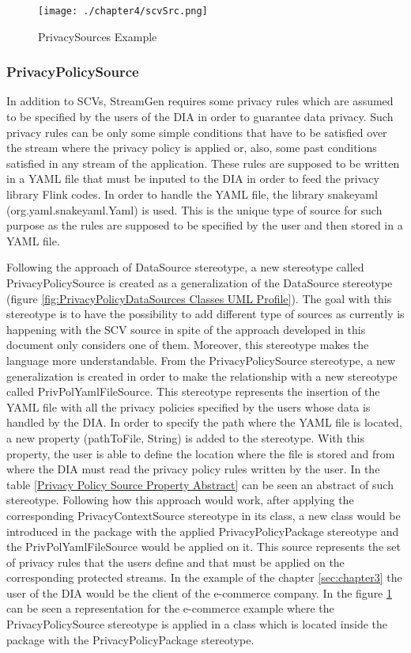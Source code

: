 \begin{figure}
\centering
{\texttt{[image: ./chapter4/scvSrc.png]}}
\caption{PrivacySources Example}
\label{fig:PrivacySources Example}
\end{figure}

\subsubsection{PrivacyPolicySource}

In addition to SCVs, StreamGen requires some privacy rules which are assumed to be specified by the users of the DIA in order to guarantee data privacy. Such privacy rules can be only some simple conditions that have to be satisfied over the stream where the privacy policy is applied or, also, some past conditions satisfied in any stream of the application. These rules are supposed to be written in a YAML file that must be inputed to the DIA in order to feed the privacy library Flink codes. In order to handle the YAML file, the library snakeyaml (org.yaml.snakeyaml.Yaml) is used. This is the unique type of source for such purpose as the rules are supposed to be specified by the user and then stored in a YAML file.

Following the approach of DataSource stereotype, a new stereotype called PrivacyPolicySource is created as a generalization of the DataSource stereotype (figure \ref{fig:PrivacyPolicyDataSources Classes UML Profile}). The goal with this stereotype is to have the possibility to add different type of sources as currently is happening with the SCV source in spite of the approach developed in this document only considers one of them. Moreover, this stereotype makes the language more understandable. From the PrivacyPolicySource stereotype, a new generalization is created in order to make the relationship with a new stereotype called PrivPolYamlFileSource. This stereotype represents the insertion of the YAML file with all the privacy policies specified by the users whose data is handled by the DIA. In order to specify the path where the YAML file is located, a new property (pathToFile, String) is added to the stereotype. With this property, the user is able to define the location where the file is stored and from where the DIA must read the privacy policy rules written by the user. In the table \ref{Privacy Policy Source Property Abstract} can be seen an abstract of such stereotype. Following how this approach would work, after applying the corresponding PrivacyContextSource stereotype in its class, a new class would be introduced in the package with the applied PrivacyPolicyPackage stereotype and the PrivPolYamlFileSource would be applied on it. This source represents the set of privacy rules that the users define and that must be applied on the corresponding protected streams. In the example of the chapter \ref{sec:chapter3} the user of the DIA would be the client of the e-commerce company. In the figure \ref{fig:PrivacySources Example} can be seen a representation for the e-commerce example where the PrivacyPolicySource stereotype is applied in a class which is located inside the package with the PrivacyPolicyPackage stereotype.

